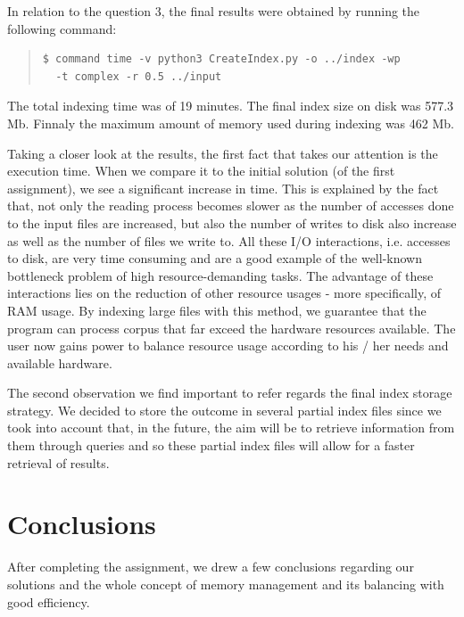 \documentclass[12pt]{article}
\begin{document}
In relation to the question 3, the final results were obtained by running the 
following command:

\begingroup
\addtolength\leftmargini{-0.4in}
\addtolength\baselineskip{-0.05in}
\begin{quote}
\begin{verbatim}
$ command time -v python3 CreateIndex.py -o ../index -wp 
  -t complex -r 0.5 ../input
\end{verbatim}
\end{quote}
\endgroup

The total indexing time was of 19 minutes. The final index size on disk was 577.3 Mb.
Finnaly the maximum amount of memory used during indexing was 462 Mb.

Taking a closer look at the results, the first fact that takes our attention is the
execution time.
When we compare it to the initial solution (of the first assignment), we see a
significant increase in time.
This is explained by the fact that, not only the reading process becomes slower
as the number of accesses done to the input files are increased, but also the 
number of writes to disk also increase as well as the number of files we write to.
All these I/O interactions, i.e. accesses to disk, are very time consuming and 
are a good example of the well-known bottleneck problem of high resource-demanding tasks.
The advantage of these interactions lies on the reduction of other resource usages - 
more specifically, of RAM usage. 
By indexing large files with this method, we guarantee that the program can process
corpus that far exceed the hardware resources available.
The user now gains power to balance resource usage according to his / her needs and
available hardware.

The second observation we find important to refer regards the final index storage 
strategy. We decided to store the outcome in several partial index files since we
took into account that, in the future, the aim will be to retrieve information from
them through queries and so these partial index files will allow for a faster retrieval
of results.

\newpage
\section*{Conclusions}

After completing the assignment, we drew a few conclusions regarding our
solutions and the whole concept of memory management and its balancing with
good efficiency.
\end{document}
